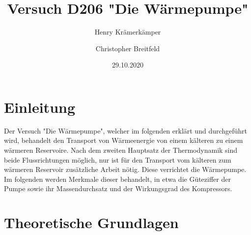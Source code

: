 \documentclass{scrartcl} %
\begin{document}
\title{Versuch D206 "Die Wärmepumpe"}
\author{Henry Krämerkämper \and Christopher Breitfeld}
\date{29.10.2020}
\maketitle
\newpage
\tableofcontents
\newpage
\section{Einleitung}
Der Versuch "Die Wärmepumpe", welcher im folgenden erklärt und durchgeführt wird, behandelt den Transport von
Wärmeenergie von einem kälteren zu einem wärmeren Reservoire. Nach dem zweiten Hauptsatz der Thermodynamik sind beide
Flussrichtungen möglich, nur ist für den Transport vom kälteren zum wärmeren Reservoir zusätzliche Arbeit nötig. Diese verrichtet die Wärmepumpe.
Im folgenden werden Merkmale dieser behandelt, in etwa die Güteziffer der Pumpe sowie ihr Massendurchsatz und der Wirkungsgrad des Kompressors.
\section{Theoretische Grundlagen}
\end{document}
